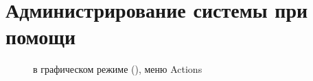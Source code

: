 \documentclass{article}
\begin{document}







\section{Администрирование системы при помощи }
\label{sec:tlmgr}

\begin{figure}[tb]
\caption{ в графическом режиме (\MacOSX), меню Actions}
\label{fig:tlshell} 
\end{figure}
\end{document}
